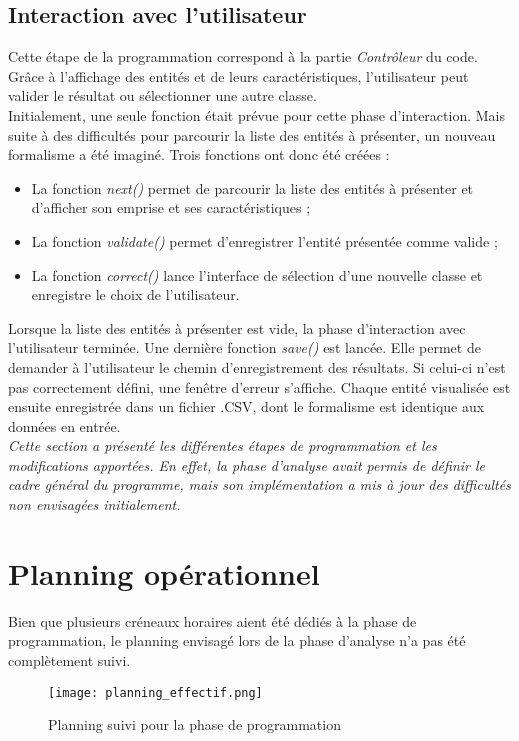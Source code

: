\newpage
\subsection{Interaction avec l'utilisateur}

Cette étape de la programmation correspond à la partie \textit{Contrôleur} du code. Grâce à l'affichage des entités et de leurs caractéristiques, l'utilisateur peut valider le résultat ou sélectionner une autre classe. \\

Initialement, une seule fonction était prévue pour cette phase d'interaction. Mais suite à des difficultés pour parcourir la liste des entités à présenter, un nouveau formalisme a été imaginé. Trois fonctions ont donc été créées :
\begin{itemize}[label=$\rightarrow$]
	\item La fonction \textit{next()} permet de parcourir la liste des entités à présenter et d'afficher son emprise et ses caractéristiques ;
	\item La fonction \textit{validate()} permet d'enregistrer l'entité présentée comme valide ;
	\item La fonction \textit{correct()} lance l'interface de sélection d'une nouvelle classe et enregistre le choix de l'utilisateur.\\
\end{itemize}

Lorsque la liste des entités à présenter est vide, la phase d'interaction avec l'utilisateur terminée. Une dernière fonction \textit{save()} est lancée. Elle permet de demander à l'utilisateur le chemin d'enregistrement des résultats. Si celui-ci n'est pas correctement défini, une fenêtre d'erreur s'affiche. Chaque entité visualisée est ensuite enregistrée dans un fichier .CSV, dont le formalisme est identique aux données en entrée. \\

\textit{Cette section a présenté les différentes étapes de programmation et les modifications apportées. En effet, la phase d'analyse avait permis de définir le cadre général du programme, mais son implémentation a mis à jour des difficultés non envisagées initialement.}\\

\section{Planning opérationnel}

Bien que plusieurs créneaux horaires aient été dédiés à la phase de programmation, le planning envisagé lors de la phase d'analyse n'a pas été complètement suivi. 

\begin{figure}[!h]
	\centering
	\texttt{[image: planning\_effectif.png]}  \\
	\caption[Planning suivi pour la phase de programmation]{Planning suivi pour la phase de programmation}
	\label{fig:planning}
\end{figure}


